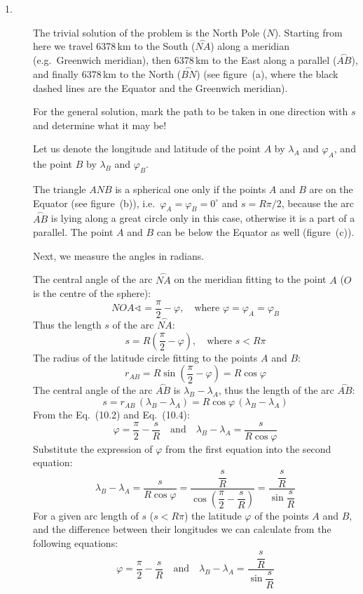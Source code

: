 \begin{description}
\item[1.] The trivial solution of the problem is the North Pole ($N$). Starting
  from here we travel 6378\,km to the South ($\overset{\frown}{NA}$) along a meridian
  (e.g.\ Greenwich meridian), then 6378\,km to the East along a parallel
  ($\overset{\frown}{AB}$), and finally 6378\,km to the North ($\overset{\frown}{BN}$) (see
  figure~(a), where the black dashed lines are the Equator and the Greenwich
  meridian).

  For the general solution, mark the path to be taken in one direction with $s$
  and determine what it may be!

  Let us denote the longitude and latitude of the point $A$ by $\lambda_A$ and
  $\varphi_A$, and the point $B$ by $\lambda_B$ and $\varphi_B$.

  The triangle $ANB$ is a spherical one only if the points $A$ and $B$ are on
  the Equator (see figure~(b)), i.e.\ $\varphi_A = \varphi_B = 0^\circ$ and
  $s = R\pi/2$, because the arc $\overset{\frown}{AB}$ is lying along a great circle
  only in this case, otherwise it is a part of a parallel. The point $A$ and
  $B$ can be below the Equator as well (figure~(c)).


  Next, we measure the angles in radians.

  The central angle of the arc $\overset{\frown}{NA}$ on the meridian fitting to the
  point $A$ ($O$ is the centre of the sphere):
  \[
    NOA\sphericalangle = \frac{\pi}{2} - \varphi,
    \quad\text{where } \varphi = \varphi_A = \varphi_B \tag{10.1}
  \]
  Thus the length $s$ of the arc $\overset{\frown}{NA}$:
  \[
    s = R\left(\frac{\pi}{2} - \varphi\right),
    \quad\text{where } s < R\pi \tag{10.2}
  \]
  The radius of the latitude circle fitting to the points $A$ and $B$:
  \[
    r_{AB} = R\sin\left(\frac{\pi}{2} - \varphi\right) = R\cos\varphi
    \tag{10.3}
  \]
  The central angle of the arc $\overset{\frown}{AB}$ is $\lambda_B - \lambda_A$,
  thus the length of the arc $\overset{\frown}{AB}$:
  \[
    s = r_{AB}\,(\lambda_B - \lambda_A) = R\cos\varphi\,(\lambda_B - \lambda_A)
    \tag{10.4}
  \]
  From the Eq.~(10.2) and Eq.~(10.4):
  \[
    \varphi = \frac{\pi}{2} - \frac{s}{R}
    \quad\text{and}\quad
    \lambda_B - \lambda_A = \frac{s}{R\cos\varphi} \tag{10.5}
  \]
  Substitute the expression of $\varphi$ from the first equation into the
  second equation:
  \[
    \lambda_B - \lambda_A = \frac{s}{R\cos\varphi}
      = \frac{\dfrac{s}{R}}{\cos\left(\dfrac{\pi}{2} - \dfrac{s}{R}\right)}
      = \frac{\dfrac{s}{R}}{\sin\dfrac{s}{R}} \tag{10.6}
  \]
  For a given arc length of $s$ ($s < R\pi$) the latitude $\varphi$ of the
  points $A$ and $B$, and the difference between their longitudes we can
  calculate from the following equations:
  \[
    \varphi = \frac{\pi}{2} - \frac{s}{R}
    \quad\text{and}\quad
    \lambda_B - \lambda_A = \frac{\dfrac{s}{R}}{\sin\dfrac{s}{R}} \tag{10.7}
  \]


\end{description}
